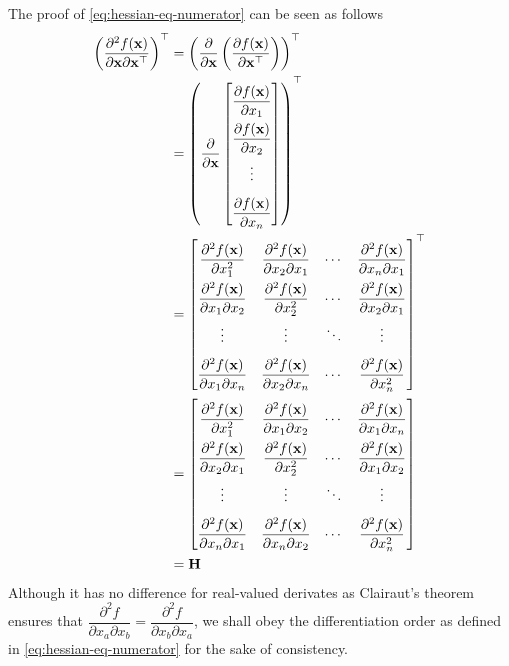 The proof of \eqref{eq:hessian-eq-numerator} can be seen as follows
\begin{align}
    \left( \dfrac{\partial^{2} f(\mathbf{x})}{\partial \mathbf{x} \partial \mathbf{x}^\top} \right)^\top & = \left( \dfrac{\partial }{\partial \mathbf{x}}\left( \dfrac{\partial f(\mathbf{x})}{\partial \mathbf{x}^\top} \right) \right)^\top \\
    & = \left( \dfrac{\partial }{\partial \mathbf{x}} \begin{bmatrix}
        \dfrac{\partial f(\mathbf{x})}{\partial x_1}\\
        \dfrac{\partial f(\mathbf{x})}{\partial x_2}\\
        \vdots\\
        \dfrac{\partial f(\mathbf{x})}{\partial x_n}
    \end{bmatrix} \right)^\top\\
    & = \renewcommand{\arraystretch}{2.2}\begin{bmatrix}
        \dfrac{\partial^2 f(\mathbf{x})}{\partial x_1^2} & \dfrac{\partial^2 f(\mathbf{x})}{\partial x_2\partial x_1} & \cdots & \dfrac{\partial^2 f(\mathbf{x})}{\partial x_n\partial x_1}\\
        \dfrac{\partial^2 f(\mathbf{x})}{\partial x_1\partial x_2} & \dfrac{\partial^2 f(\mathbf{x})}{\partial x_2^2} & \cdots & \dfrac{\partial^2 f(\mathbf{x})}{\partial x_2\partial x_1}\\
        \vdots&\vdots& \ddots&\vdots\\
        \dfrac{\partial^2 f(\mathbf{x})}{\partial x_1\partial x_n} & \dfrac{\partial^2 f(\mathbf{x})}{\partial x_2\partial x_n} & \cdots & \dfrac{\partial^2 f(\mathbf{x})}{\partial x_n^2}\\
    \end{bmatrix}^\top \\
    & = \renewcommand{\arraystretch}{2.2}\begin{bmatrix}
        \dfrac{\partial^2 f(\mathbf{x})}{\partial x_1^2} & \dfrac{\partial^2 f(\mathbf{x})}{\partial x_1\partial x_2} & \cdots & \dfrac{\partial^2 f(\mathbf{x})}{\partial x_1\partial x_n}\\
        \dfrac{\partial^2 f(\mathbf{x})}{\partial x_2\partial x_1} & \dfrac{\partial^2 f(\mathbf{x})}{\partial x_2^2} & \cdots & \dfrac{\partial^2 f(\mathbf{x})}{\partial x_1\partial x_2}\\
        \vdots&\vdots& \ddots&\vdots\\
        \dfrac{\partial^2 f(\mathbf{x})}{\partial x_n\partial x_1} & \dfrac{\partial^2 f(\mathbf{x})}{\partial x_n\partial x_2} & \cdots & \dfrac{\partial^2 f(\mathbf{x})}{\partial x_n^2}\\
    \end{bmatrix} \\
    & = \mathbf{H}
\end{align}
Although it has no difference for real-valued derivates as Clairaut's theorem ensures that \cite{stewart2020calculus} \(\dfrac{\partial^{2} f}{\partial x_a \partial x_b} = \dfrac{\partial^{2} f}{\partial x_b \partial x_a}\), we shall obey the differentiation order as defined in \eqref{eq:hessian-eq-numerator} for the sake of consistency.

